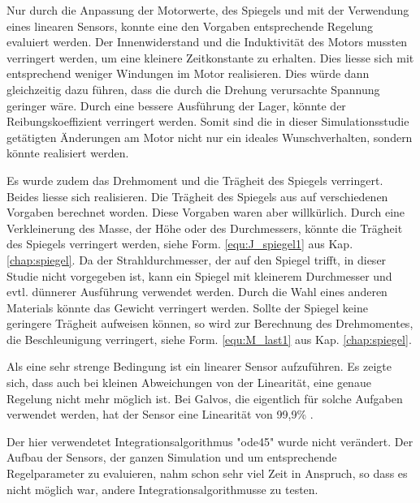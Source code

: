 Nur durch die Anpassung der Motorwerte, des Spiegels und mit der Verwendung eines linearen Sensors, konnte eine den Vorgaben entsprechende Regelung evaluiert werden.
Der Innenwiderstand und die Induktivität des Motors mussten verringert werden, um eine kleinere Zeitkonstante zu erhalten.
Dies liesse sich mit entsprechend weniger Windungen im Motor realisieren.
Dies würde dann gleichzeitig dazu führen, dass die durch die Drehung verursachte Spannung geringer wäre.
Durch eine bessere Ausführung der Lager, könnte der Reibungskoeffizient verringert werden.
Somit sind die in dieser Simulationsstudie getätigten Änderungen am Motor nicht nur ein ideales Wunschverhalten, sondern könnte realisiert werden.

Es wurde zudem das Drehmoment und die Trägheit des Spiegels verringert.
Beides liesse sich realisieren.
Die Trägheit des Spiegels aus auf verschiedenen Vorgaben berechnet worden.
Diese Vorgaben waren aber willkürlich.
Durch eine Verkleinerung des Masse, der Höhe oder des Durchmessers, könnte die Trägheit des Spiegels verringert werden, siehe Form. \ref{equ:J_spiegel1} aus
Kap. \ref{chap:spiegel}.
Da der Strahldurchmesser, der auf den Spiegel trifft, in dieser Studie nicht vorgegeben ist, kann ein Spiegel mit kleinerem Durchmesser und evtl. dünnerer Ausführung
verwendet werden.
Durch die Wahl eines anderen Materials könnte das Gewicht verringert werden.
Sollte der Spiegel keine geringere Trägheit aufweisen können, so wird zur Berechnung des Drehmomentes, die Beschleunigung verringert, siehe Form. \ref{equ:M_last1} aus
Kap. \ref{chap:spiegel}.

Als eine sehr strenge Bedingung ist ein linearer Sensor aufzuführen.
Es zeigte sich, dass auch bei kleinen Abweichungen von der Linearität, eine genaue Regelung nicht mehr möglich ist.
Bei Galvos, die eigentlich für solche Aufgaben verwendet werden, hat der Sensor eine Linearität von 99,9\% \cite{CaTe}.

Der hier verwendetet Integrationsalgorithmus "ode45" wurde nicht verändert.
Der Aufbau der Sensors, der ganzen Simulation und um entsprechende Regelparameter zu evaluieren, nahm schon sehr viel Zeit in Anspruch, so dass es nicht möglich war, andere
Integrationsalgorithmusse zu testen.